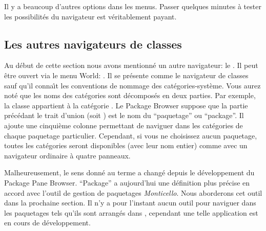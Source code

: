 \documentclass[a4paper,10pt,twoside]{book}
\begin{document}
Il y a beaucoup d'autres options dans les menus.  Passer quelques
minutes \`a tester les possibilit\'es du navigateur est v\'eritablement payant.  


\subsection{Les autres navigateurs de classes}
\label{sec:otherBrowsers}

Au d\'ebut de cette section nous avons mentionn\'e un autre navigateur:
le . 
Il peut \^etre ouvert via le menu World: .
Il se pr\'esente comme le navigateur de classes sauf qu'il conna\^{\i}t
les conventions de nommage des cat\'egories-syst\`eme.
Vous aurez not\'e que les noms des cat\'egories sont d\'ecompos\'es en deux
parties.
Par exemple, la classe  appartient \`a la cat\'egorie
.
\label{sec:package-names}
Le Package Browser suppose que la partie pr\'ec\'edant le trait d'union
(soit ) est le nom du ``paquetage'' ou ``package''. 
Il ajoute une cinqui\`eme
colonne permettant de naviguer dans les cat\'egories de chaque paquetage particulier. Cependant, si vous ne choisissez aucun paquetage, toutes les cat\'egories
seront disponibles 
(avec leur nom entier)
comme avec un navigateur ordinaire \`a quatre panneaux.

Malheureusement, le sens donn\'e au terme  a chang\'e depuis
le d\'eveloppement du Package Pane Browser. ``Package'' a aujourd'hui
une d\'efinition plus pr\'ecise en accord avec l'outil de gestion
de paquetages \emph{Monticello}. Nous aborderons cet outil dans la
prochaine section.  Il n'y a pour l'instant aucun outil pour naviguer
dans les paquetages tels qu'ils sont arrang\'es dans , cependant
une telle application est en cours de d\'eveloppement.
\end{document}
